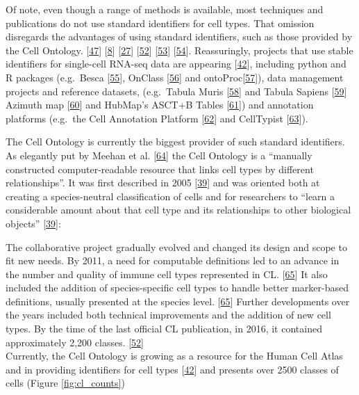 Of note, even though a range of methods is available, most techniques and publications do not use standard identifiers for cell types.
That omission disregards the advantages of using standard identifiers, such as those provided by the Cell Ontology. {[}\protect\hyperlink{ref-ii1dVqoy}{47}{]} {[}\protect\hyperlink{ref-tvnuubVW}{8}{]} {[}\protect\hyperlink{ref-J5X2Xu6M}{27}{]} {[}\protect\hyperlink{ref-agnqfdk6}{52}{]} {[}\protect\hyperlink{ref-SozKx0lF}{53}{]} {[}\protect\hyperlink{ref-15xnotFsw}{54}{]}.
Reassuringly, projects that use stable identifiers for single-cell RNA-seq data are appearing {[}\protect\hyperlink{ref-qT8WxqjA}{42}{]}, including python and R packages (e.g.~Besca {[}\protect\hyperlink{ref-P1gDLuog}{55}{]}, OnClass {[}\protect\hyperlink{ref-sW6aNZJB}{56}{]} and ontoProc{[}\protect\hyperlink{ref-15YmDXALp}{57}{]}), data management projects and reference datasets, (e.g.~Tabula Muris {[}\protect\hyperlink{ref-tdlWsvTd}{58}{]} and Tabula Sapiens {[}\protect\hyperlink{ref-FjUqVIOp}{59}{]} Azimuth map {[}\protect\hyperlink{ref-T7RxnUNw}{60}{]} and HubMap's ASCT+B Tables {[}\protect\hyperlink{ref-1FghWzORJ}{61}{]}) and annotation platforms (e.g.~the Cell Annotation Platform {[}\protect\hyperlink{ref-yMavNVkS}{62}{]} and CellTypist {[}\protect\hyperlink{ref-123DiCgc8}{63}{]}).

The Cell Ontology is currently the biggest provider of such standard identifiers.
As elegantly put by Meehan et al. {[}\protect\hyperlink{ref-UduMr7x2}{64}{]} the Cell Ontology is a ``manually constructed computer-readable resource that links cell types by different relationships''.
It was first described in 2005 {[}\protect\hyperlink{ref-1CI8uS6ka}{39}{]} and was oriented both at creating a species-neutral classification of cells and
for researchers to ``learn a considerable amount about that cell type and its relationships to other biological objects'' {[}\protect\hyperlink{ref-1CI8uS6ka}{39}{]}:

The collaborative project gradually evolved and changed its design and scope to fit new needs.
By 2011, a need for computable definitions led to an advance in the number and quality of immune cell types represented in CL. {[}\protect\hyperlink{ref-ecteO8vI}{65}{]}
It also included the addition of species-specific cell types to handle better marker-based definitions, usually presented at the species level. {[}\protect\hyperlink{ref-ecteO8vI}{65}{]}
Further developments over the years included both technical improvements and the addition of new cell types.
By the time of the last official CL publication, in 2016, it contained approximately 2,200 classes. {[}\protect\hyperlink{ref-agnqfdk6}{52}{]}\\
Currently, the Cell Ontology is growing as a resource for the Human Cell Atlas and in providing identifiers for cell types {[}\protect\hyperlink{ref-qT8WxqjA}{42}{]} and presents over 2500 classes of cells (Figure \ref{fig:cl_counts})

